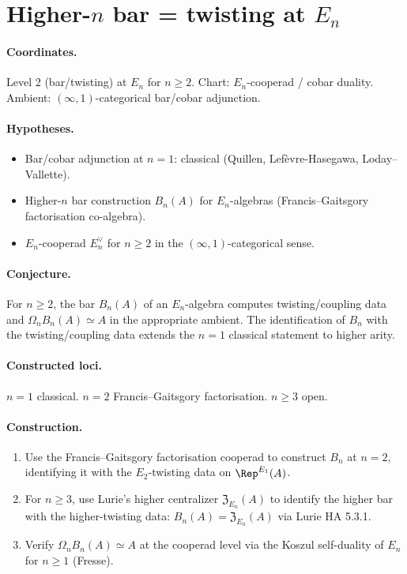 \section{Higher-$n$ bar = twisting at $E_n$}
\label{sec:open-higher-n-bar}

\paragraph{Coordinates.} Level 2 (bar/twisting) at $E_n$ for $n \geq 2$.
Chart: $E_n$-cooperad / cobar duality. Ambient:
$(\infty, 1)$-categorical bar/cobar adjunction.

\paragraph{Hypotheses.}
\begin{itemize}[nosep]
\item Bar/cobar adjunction at $n = 1$: classical
  (Quillen, Lefèvre-Hasegawa, Loday--Vallette).
\item Higher-$n$ bar construction $B_n(A)$ for $E_n$-algebras
  (Francis--Gaitsgory factorisation co-algebra).
\item $E_n$-cooperad $E_n^{\vee}$ for $n \geq 2$ in the
  $(\infty, 1)$-categorical sense.
\end{itemize}

\paragraph{Conjecture.} For $n \geq 2$, the
bar $B_n(A)$ of an $E_n$-algebra computes twisting/coupling data and
$\Omega_n B_n(A) \simeq A$ in the appropriate ambient. The
identification of $B_n$ with the twisting/coupling data extends the
$n = 1$ classical statement to higher arity.

\paragraph{Constructed loci.} $n = 1$ classical. $n = 2$ Francis--Gaitsgory
factorisation. $n \geq 3$ open.

\paragraph{Construction.}
\begin{enumerate}[nosep]
\item Use the Francis--Gaitsgory factorisation cooperad to construct
  $B_n$ at $n = 2$, identifying it with the $E_2$-twisting data on
  $\Rep^{E_1}(A)$.
\item For $n \geq 3$, use Lurie's higher centralizer
  $\mathfrak{Z}_{E_n}(A)$ to identify the higher bar with the
  higher-twisting data: $B_n(A) = \mathfrak{Z}_{E_n}(A)$ via
  Lurie HA 5.3.1.
\item Verify $\Omega_n B_n(A) \simeq A$ at the cooperad level via the
  Koszul self-duality of $E_n$ for $n \geq 1$ (Fresse).
\end{enumerate}

